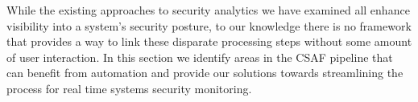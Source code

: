 While the existing approaches to security analytics we have examined all enhance visibility into a system's security posture, to our knowledge there is no framework that provides a way to link these disparate processing steps without some amount of user interaction. In this section we identify areas in the CSAF pipeline that can benefit from automation and provide our solutions towards streamlining the process for real time systems security monitoring.%

